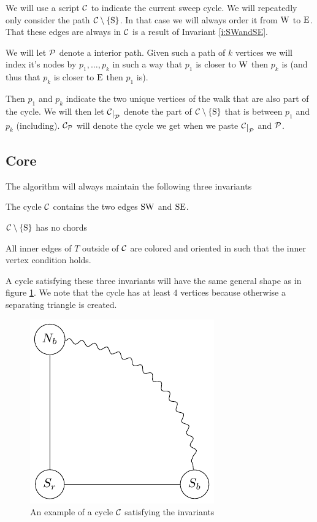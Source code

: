 We will use a script $\C$ to indicate the current sweep cycle.
We will repeatedly only consider the path $\cpath$. In that case we will always order it from $\pW$ to $\pE$. That these edges are always in $\C$ is a result of Invariant \ref{i:SWandSE}.

We will let $\P$ denote a interior path. Given such a path of $k$ vertices we will index it's nodes by $p_1, \ldots, p_k$ in such a way that $p_1$ is closer to $\pW$ then $p_k$ is (and thus that $p_k$ is closer to $\pE$ then $p_1$ is).

Then $p_1$ and $p_k$ indicate the two unique vertices of the walk that are also part of the cycle. We will then let $\restC{\P}$ denote the part of $\cpath$ that is between $p_1$ and $p_k$ (including). $\C_\P$ will denote the cycle we get when we paste $\restC{\P}$ and $\P$.



\subsection{Core}
\label{ss:core}

The algorithm will always maintain the following three invariants

\begin{invariants}
  \itemsep=-4pt

\item \label{i:SWandSE} The cycle $\C$ contains the two edges $\pS \pW$ and $\pS \pE$.
\item \label{i:noChords} $\cpath$ has no chords
\item \label{i:last} All inner edges of $T$ outside of $\C$ are colored and oriented in such that the inner vertex condition holds. %
\end{invariants}

A cycle satisfying these three invariants will have the same general shape as in figure \ref{fig:invCycle}. We note that the cycle has at least $4$ vertices because otherwise a separating triangle is created.

\begin{figure}[h!]
\centering
\includegraphics{algo/img/invCycle}

\caption{An example of a cycle $\C$ satisfying the invariants
    \label{fig:invCycle}}
\end{figure}

